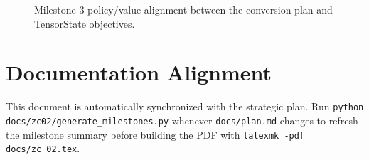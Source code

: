 \documentclass{article}
\begin{document}
\begin{figure}[t]
  \centering
  
  \caption{Milestone 3 policy/value alignment between the conversion plan and TensorState objectives.}
  \label{fig:policy-value-alignment}
\end{figure}

\section{Documentation Alignment}
This document is automatically synchronized with the strategic plan. Run
\texttt{python docs/zc02/generate\_milestones.py} whenever \texttt{docs/plan.md} changes to refresh the milestone summary before
building the PDF with \texttt{latexmk -pdf docs/zc\_02.tex}.
\end{document}

